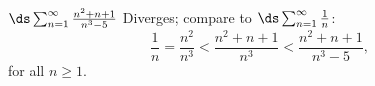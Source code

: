 {$\ds \sum_{n=1}^\infty \frac{n^2+n+1}{n^3-5}$
}
{Diverges; compare to $\ds \sum_{n=1}^\infty \frac{1}{n}$:
$$\frac 1n = \frac{n^2}{n^3} < \frac{n^2+n+1}{n^3} < \frac{n^2+n+1}{n^3-5},$$ for all $n\geq 1$. 
}